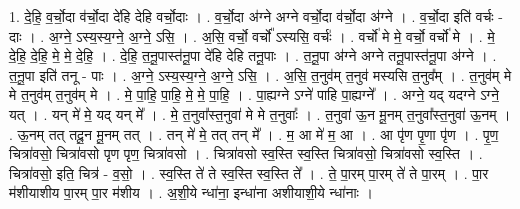 \documentclass[17pt]{extarticle}
\begin{document}
1. दे॒हि॒ व॒र्चो॒दा व॑र्चो॒दा दे॑हि देहि वर्चो॒दाः । . व॒र्चो॒दा अ॑ग्ने अग्ने वर्चो॒दा व॑र्चो॒दा अ॑ग्ने । . व॒र्चो॒दा इति॑ वर्चः - दाः । . अ॒ग्ने॒ ऽस्य॒स्य॒ग्ने॒ अ॒ग्ने॒ ऽसि॒ । . अ॒सि॒ वर्चो॒ वर्चो᳚ ऽस्यसि॒ वर्चः॑ । . वर्चो॑ मे मे॒ वर्चो॒ वर्चो॑ मे । . मे॒ दे॒हि॒ दे॒हि॒ मे॒ मे॒ दे॒हि॒ । . दे॒हि॒ त॒नू॒पास्त॑नू॒पा दे॑हि देहि तनू॒पाः । . त॒नू॒पा अ॑ग्ने अग्ने तनू॒पास्त॑नू॒पा अ॑ग्ने । . त॒नू॒पा इति॑ तनू - पाः । . अ॒ग्ने॒ ऽस्य॒स्य॒ग्ने॒ अ॒ग्ने॒ ऽसि॒ । . अ॒सि॒ त॒नुव॑म् त॒नुव॑ मस्यसि त॒नुव᳚म् । . त॒नुव॑म् मे मे त॒नुव॑म् त॒नुव॑म् मे । . मे॒ पा॒हि॒ पा॒हि॒ मे॒ मे॒ पा॒हि॒ । . पा॒ह्यग्ने ऽग्ने॑ पाहि पा॒ह्यग्ने᳚ । . अग्ने॒ यद् यदग्ने ऽग्ने॒ यत् । . यन् मे॑ मे॒ यद् यन् मे᳚ । . मे॒ त॒नुवा᳚स्त॒नुवा॑ मे मे त॒नुवाः᳚ । . त॒नुवा॑ ऊ॒न मू॒नम् त॒नुवा᳚स्त॒नुवा॑ ऊ॒नम् । . ऊ॒नम् तत् तदू॒न मू॒नम् तत् । . तन् मे॑ मे॒ तत् तन् मे᳚ । . म॒ आ मे॑ म॒ आ । . आ पृ॑ण पृ॒णा पृ॑ण । . पृ॒ण॒ चित्रा॑वसो॒ चित्रा॑वसो पृण पृण॒ चित्रा॑वसो । . चित्रा॑वसो स्व॒स्ति स्व॒स्ति चित्रा॑वसो॒ चित्रा॑वसो स्व॒स्ति । . चित्रा॑वसो॒ इति॒ चित्र॑ - व॒सो॒ । . स्व॒स्ति ते॑ ते स्व॒स्ति स्व॒स्ति ते᳚ । . ते॒ पा॒रम् पा॒रम् ते॑ ते पा॒रम् । . पा॒र म॑शीयाशीय पा॒रम् पा॒र म॑शीय । . अ॒शी॒ये न्धा॑ना॒ इन्धा॑ना अशीयाशी॒ये न्धा॑नाः । \newline
\end{document}
